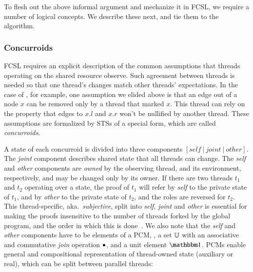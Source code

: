To flesh out the above informal argument and mechanize it in FCSL, we
require a number of logical concepts. We describe these next, and tie
them to the  algorithm.


\subsubsection{Concurroids}
\label{sec:conc-graph-prot}

FCSL requires an explicit description of the common assumptions that
threads operating on the shared resource observe. Such agreement
between threads is needed so that one thread's changes match other
threads' expectations. In the case of , for example, one
assumption we elided above is that an edge out of a node $x$ can be
removed only by a thread that marked $x$. This thread can rely on the
property that edges to $x.l$ and $x.r$ won't be nullified by another
thread. These assumptions are formalized by STSs of a special form,
which are called \emph{concurroids}.


A state of each concurroid is divided into three components
$[\mathit{self}~|~\mathit{joint}~|~\mathit{other}]$. The \emph{joint}
component describes shared state that all threads can change. The
\emph{self} and \emph{other} components are \emph{owned} by the
observing thread, and its environment, respectively, and may be
changed only by its owner. If there are two threads $t_1$ and $t_2$
operating over a state, the proof of $t_1$ will refer by \emph{self}
to the private state of $t_1$, and by \emph{other} to the private
state of $t_2$, and the roles are reversed for $t_2$.
This thread-specific, aka.~\emph{subjective}, split into \emph{self},
\emph{joint} and \emph{other} is essential for making the proofs
insensitive to the number of threads forked by the global program, and
the order in which this is done~\cite{LeyWild-Nanevski:POPL13}. We
also note that the \emph{self} and \emph{other} components have to be
elements of a PCM, \ie, a set $\mathbb{U}$ with an associative and
commutative \emph{join} operation $\bullet$, and a unit element $\pcmU$.
%
PCMs enable general and compositional representation of thread-owned
state (auxiliary or real), which can be split between parallel
threads\cite{LeyWild-Nanevski:POPL13,Nanevski-al:ESOP14}:

